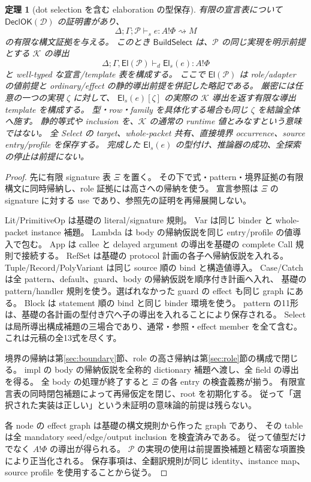 \documentclass[11pt,a4paper]{article}
\newtheorem{theorem}[definition]{定理}
\newcommand{\El}{\mathsf{El}}
\newcommand{\Core}{\mathcal K}
\newcommand{\Ty}{\mathrel{\vdash_d}}
\begin{document}
\begin{theorem}[dot selection を含む elaboration の型保存]
\label{thm:elaboration}
有限の宣言表について \(\mathsf{DeclOK}(\mathcal D)\) の証明書があり、
\[
 \Delta;\Gamma;\mathcal P\vdash_s e:A!\Phi\rightsquigarrow M
\]
の有限な構文証拠を与える。
このとき \(\mathsf{BuildSelect}\) は、\(\mathcal P\) の同じ実現を明示前提とする
\(\Core\) の導出
\[
 \Delta;\Gamma,\El(\mathcal P)\Ty \El_s(e):A!\Phi
\]
と well-typed な宣言/template 表を構成する。
ここで \(\El(\mathcal P)\) は role/adapter の値前提と ordinary/effect の静的導出前提を併記した略記である。
厳密には任意の一つの実現 \(\zeta\) に対して、
\(\El_s(e)[\zeta]\) の実際の \(\Core\) 導出を返す有限な導出 template を構成する。
型・row・family を具体化する場合も同じ \(\zeta\) を結論全体へ施す。
静的等式や inclusion を、\(\Core\) の通常の runtime 値とみなすという意味ではない。
全 Select の target、whole-packet 共有、直接境界 occurrence、source entry/profile を保存する。
完成した \(\El_s(e)\) の型付け、推論器の成功、全探索の停止は前提にない。
\end{theorem}
\begin{proof}
先に有限 signature 表 \(\Xi\) を置く。
その下で式・pattern・境界証拠の有限構文に同時帰納し、role 証拠には高さへの帰納を使う。
宣言参照は \(\Xi\) の signature に対する use であり、参照先の証明を再帰展開しない。

Lit/PrimitiveOp は基礎の literal/signature 規則。
Var は同じ binder と whole-packet instance 補題。
Lambda は body の帰納仮説を同じ entry/profile の値導入で包む。
App は callee と delayed argument の導出を基礎の complete Call 規則で接続する。
RefSet は基礎の protocol 計画の各子へ帰納仮説を入れる。
Tuple/Record/PolyVariant は同じ source 順の bind と構造値導入。
Case/Catch は全 pattern、default、guard、body の帰納仮説を順序付き計画へ入れ、
基礎の pattern/handler 規則を使う。選ばれなかった guard の effect も同じ graph にある。
Block は statement 順の bind と同じ binder 環境を使う。
pattern の11形は、基礎の各計画の型付き穴へ子の導出を入れることにより保存される。
Select は局所導出構成補題の三場合であり、通常・参照・effect member を全て含む。
これは元稿の全13式を尽くす。

境界の帰納は第\ref{sec:boundary}節、role の高さ帰納は第\ref{sec:role}節の構成で閉じる。
impl の body の帰納仮説を全称的 dictionary 補題へ渡し、全 field の導出を得る。
全 body の処理が終了すると \(\Xi\) の各 entry の検査義務が揃う。
有限宣言表の同時閉包補題によって再帰仮定を閉じ、root を初期化する。
従って「選択された実装は正しい」という未証明の意味論的前提は残らない。

各 node の effect graph は基礎の構文規則から作った graph であり、
その table は全 mandatory seed/edge/output inclusion を検査済みである。
従って値型だけでなく \(A!\Phi\) の導出が得られる。
\(\mathcal P\) の実現の使用は前提置換補題と精密な項置換により正当化される。
保存事項は、全翻訳規則が同じ identity、instance map、source profile を使用することから従う。
\end{proof}
\end{document}
